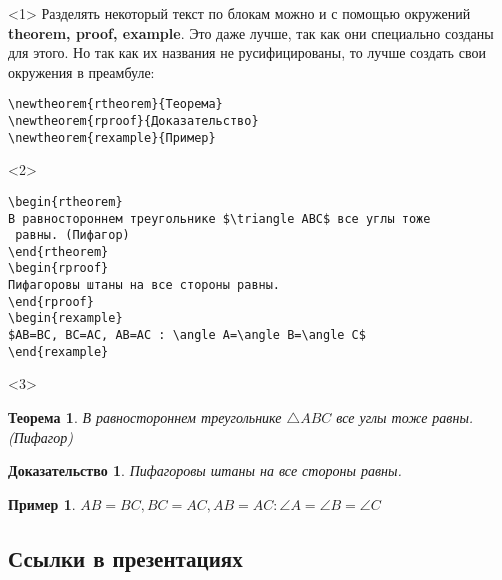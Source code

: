 \documentclass[aspectratio=169,
]{beamer}
\newtheorem{rtheorem}{Теорема}
\newtheorem{rproof}{Доказательство}
\newtheorem{rexample}{Пример}
\begin{document}
\begin{frame}[fragile, label=f15]
\frametitle{\insertsection}
\framesubtitle{\insertsubsection}
\begin{onlyenv}<1>
Разделять некоторый текст по блокам можно и с помощью окружений \textbf{theorem, proof, example}. Это даже лучше, так как они специально созданы для этого. Но так как их названия не русифицированы, то лучше создать свои окружения в преамбуле: \\
\begin{verbatim}
\newtheorem{rtheorem}{Теорема}
\newtheorem{rproof}{Доказательство}
\newtheorem{rexample}{Пример}
\end{verbatim}
\end{onlyenv}

\begin{onlyenv}<2>
\begin{verbatim}
\begin{rtheorem}
В равностороннем треугольнике $\triangle ABC$ все углы тоже
 равны. (Пифагор)
\end{rtheorem}
\begin{rproof}
Пифагоровы штаны на все стороны равны.
\end{rproof}
\begin{rexample}
$AB=BC, BC=AC, AB=AC : \angle A=\angle B=\angle C$
\end{rexample}
\end{verbatim}
\end{onlyenv}

\begin{onlyenv}<3>
\begin{rtheorem}
В равностороннем треугольнике $\triangle ABC$ все углы тоже равны. (Пифагор)
\end{rtheorem}
\begin{rproof}
Пифагоровы штаны на все стороны равны.
\end{rproof}
\begin{rexample}
$AB=BC, BC=AC, AB=AC : \angle A=\angle B=\angle C$
\end{rexample}
\end{onlyenv}
\end{frame}



\subsection{Ссылки в презентациях}
\end{document}
